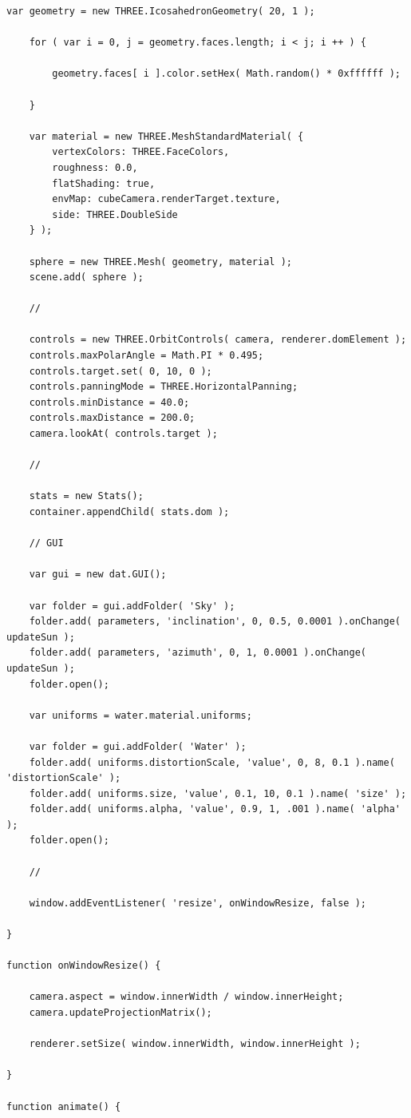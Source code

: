 \documentclass[BTech]{srmuthesis}
\begin{document}
\begin{lstlisting}[caption=Lighting and Water Simulation]
	var geometry = new THREE.IcosahedronGeometry( 20, 1 );
	
	for ( var i = 0, j = geometry.faces.length; i < j; i ++ ) {
		
		geometry.faces[ i ].color.setHex( Math.random() * 0xffffff );
		
	}
	
	var material = new THREE.MeshStandardMaterial( {
		vertexColors: THREE.FaceColors,
		roughness: 0.0,
		flatShading: true,
		envMap: cubeCamera.renderTarget.texture,
		side: THREE.DoubleSide
	} );
	
	sphere = new THREE.Mesh( geometry, material );
	scene.add( sphere );
	
	//
	
	controls = new THREE.OrbitControls( camera, renderer.domElement );
	controls.maxPolarAngle = Math.PI * 0.495;
	controls.target.set( 0, 10, 0 );
	controls.panningMode = THREE.HorizontalPanning;
	controls.minDistance = 40.0;
	controls.maxDistance = 200.0;
	camera.lookAt( controls.target );
	
	//
	
	stats = new Stats();
	container.appendChild( stats.dom );
	
	// GUI
	
	var gui = new dat.GUI();
	
	var folder = gui.addFolder( 'Sky' );
	folder.add( parameters, 'inclination', 0, 0.5, 0.0001 ).onChange( updateSun );
	folder.add( parameters, 'azimuth', 0, 1, 0.0001 ).onChange( updateSun );
	folder.open();
	
	var uniforms = water.material.uniforms;
	
	var folder = gui.addFolder( 'Water' );
	folder.add( uniforms.distortionScale, 'value', 0, 8, 0.1 ).name( 'distortionScale' );
	folder.add( uniforms.size, 'value', 0.1, 10, 0.1 ).name( 'size' );
	folder.add( uniforms.alpha, 'value', 0.9, 1, .001 ).name( 'alpha' );
	folder.open();
	
	//
	
	window.addEventListener( 'resize', onWindowResize, false );
	
}

function onWindowResize() {
	
	camera.aspect = window.innerWidth / window.innerHeight;
	camera.updateProjectionMatrix();
	
	renderer.setSize( window.innerWidth, window.innerHeight );
	
}

function animate() {
	

\end{lstlisting}
\end{document}
